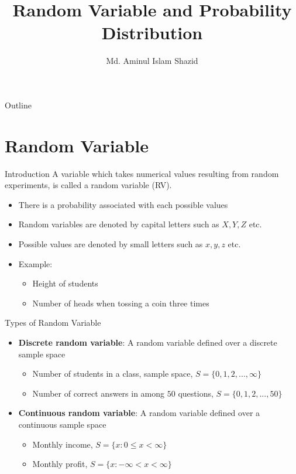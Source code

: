 \documentclass[12pt, aspectratio=169]{beamer}
\title{Random Variable and Probability Distribution}
\author{Md. Aminul Islam Shazid}
\date{}
\begin{document}
    {
		\addtocounter{framenumber}{-2}    %

		\begin{frame}
			\titlepage
		\end{frame}

		\begin{frame}{Outline}
            \vfill
			\tableofcontents[subsectionstyle=hide]
            \vfill
		\end{frame}
	}

	\section{Random Variable}

    \begin{frame}{Introduction}
        A variable which takes numerical values resulting from random experiments, is called a random variable (RV).

		\begin{itemize}
			\item There is a probability associated with each possible values
			\item Random variables are denoted by capital letters such as $X, Y, Z$ etc.
			\item Possible values are denoted by small letters such as $x, y, z$ etc.
			\item Example:
			\begin{itemize}
				\item Height of students
				\item Number of heads when tossing a coin three times
			\end{itemize}
		\end{itemize}
    \end{frame}


	\begin{frame}{Types of Random Variable}
		\begin{itemize}
			\item \textbf{Discrete random variable}: A random variable defined over a discrete sample space
			\begin{itemize}
				\item Number of students in a class, sample space, $S = \{0, 1, 2, ..., \infty\}$
				\item Number of correct answers in among $50$ questions, $S = \{0, 1, 2, ..., 50\}$
			\end{itemize}
			\item \textbf{Continuous random variable}: A random variable defined over a continuous sample space
			\begin{itemize}
				\item Monthly income, $S = \{x: 0 \leqslant x < \infty\}$
				\item Monthly profit, $S = \{x: -\infty < x < \infty\}$
			\end{itemize}
		\end{itemize}
	\end{frame}
\end{document}
